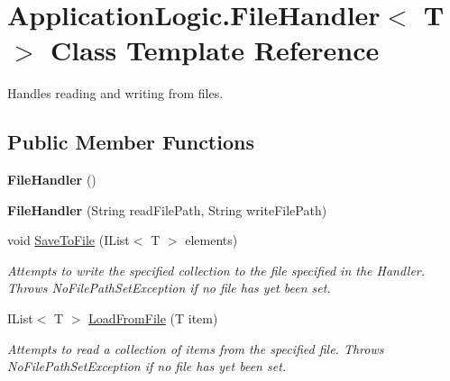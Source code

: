\hypertarget{class_application_logic_1_1_file_handler-g}{
\section{ApplicationLogic.FileHandler$<$ T $>$ Class Template Reference}
\label{class_application_logic_1_1_file_handler-g}
}


Handles reading and writing from files.  


\subsection*{Public Member Functions}
\begin{DoxyCompactItemize}
\item 
\hypertarget{class_application_logic_1_1_file_handler-g_a85eb751b626b9761fbf3d7a52a50160d}{
{\bfseries FileHandler} ()}
\label{class_application_logic_1_1_file_handler-g_a85eb751b626b9761fbf3d7a52a50160d}

\item 
\hypertarget{class_application_logic_1_1_file_handler-g_a39dd065ef83e937856d49c3de0902b15}{
{\bfseries FileHandler} (String readFilePath, String writeFilePath)}
\label{class_application_logic_1_1_file_handler-g_a39dd065ef83e937856d49c3de0902b15}

\item 
void \hyperlink{class_application_logic_1_1_file_handler-g_a945a9789fb3cdc107664237f5db71c61}{SaveToFile} (IList$<$ T $>$ elements)
\begin{DoxyCompactList}\small\item\em Attempts to write the specified collection to the file specified in the Handler. Throws NoFilePathSetException if no file has yet been set. \item\end{DoxyCompactList}\item 
IList$<$ T $>$ \hyperlink{class_application_logic_1_1_file_handler-g_ae9a64ec8eb1b07793fb2b69188c58f6b}{LoadFromFile} (T item)
\begin{DoxyCompactList}\small\item\em Attempts to read a collection of items from the specified file. Throws NoFilePathSetException if no file has yet been set. \item\end{DoxyCompactList}\end{DoxyCompactItemize}
